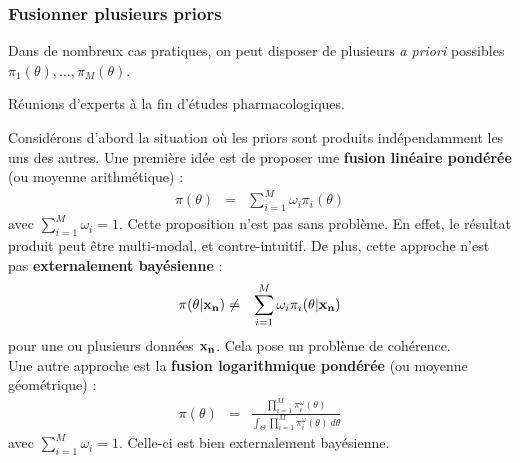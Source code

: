 


\clearpage
\subsubsection{Fusionner plusieurs priors}\label{fusion}

Dans de nombreux cas pratiques, on peut disposer de plusieurs {\it a priori} possibles
$\pi_1(\theta),\ldots,\pi_M(\theta)$. \\ 

\begin{exo}
Réunions d'experts à la fin d'études pharmacologiques. \\
\end{exo}

Considérons d'abord la situation où les priors sont produits indépendamment les uns des autres. Une première idée est de proposer une {\bf fusion linéaire pondérée} (ou moyenne arithmétique) :
\begin{eqnarray*}
\pi(\theta) & = & \sum\limits_{i=1}^M \omega_i \pi_i(\theta)
\end{eqnarray*}
avec $\sum_{i=1}^M \omega_i=1$. Cette proposition n'est pas sans problème. En effet, le résultat produit peut être multi-modal, et contre-intuitif. De plus, cette approche n'est pas {\bf externalement bayésienne} :
\begin{eqnarray*}
\pi(\theta|{\bf x_n}) & \neq & \sum\limits_{i=1}^M \omega_i \pi_i(\theta|{\bf x_n})
\end{eqnarray*}
pour une ou plusieurs données ${\bf x_n}$. Cela pose un problème de cohérence. \\

Une autre approche est la {\bf fusion logarithmique pondérée} (ou moyenne géométrique) :
\begin{eqnarray*}
\pi(\theta) & = & \frac{\prod\limits_{i=1}^M  \pi^\omega_i(\theta)}{\int_{\Theta} \prod\limits_{i=1}^M  \pi^\omega_i(\theta) \ d\theta}
\end{eqnarray*}
avec $\sum_{i=1}^M \omega_i=1$. Celle-ci est bien externalement bayésienne. \\

